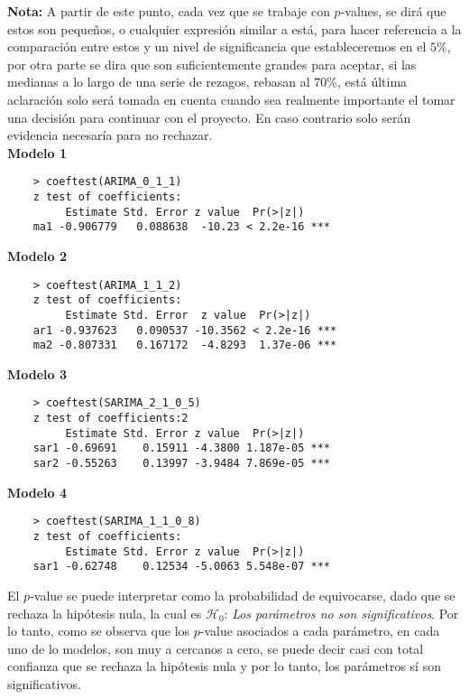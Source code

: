 \documentclass{article}
\theoremstyle{remark}
\begin{document}
\textbf{Nota:} A partir de este punto, cada vez que se trabaje con \(p\)-values, se dirá que estos son pequeños, o cualquier expresión similar a está, para hacer referencia a la comparación entre estos y un nivel de significancia que estableceremos en el \(5\%\), por otra parte se dira que son suficientemente grandes para aceptar, si las medianas a lo largo de una serie de rezagos, rebasan al \(70\%\), está última aclaración solo será tomada en cuenta cuando sea realmente importante el tomar una decisión para continuar con el proyecto. En caso contrario solo serán evidencia necesaría para no rechazar.\\

\textbf{Modelo 1}
\begin{verbatim}
    > coeftest(ARIMA_0_1_1)
    z test of coefficients:
         Estimate Std. Error z value  Pr(>|z|)    
    ma1 -0.906779   0.088638  -10.23 < 2.2e-16 ***
\end{verbatim}

\textbf{Modelo 2}
\begin{verbatim}
    > coeftest(ARIMA_1_1_2)
    z test of coefficients:
         Estimate Std. Error  z value  Pr(>|z|)    
    ar1 -0.937623   0.090537 -10.3562 < 2.2e-16 ***
    ma2 -0.807331   0.167172  -4.8293  1.37e-06 ***
\end{verbatim}
 
\textbf{Modelo 3}
\begin{verbatim}
    > coeftest(SARIMA_2_1_0_5)
    z test of coefficients:2
         Estimate Std. Error z value  Pr(>|z|)    
    sar1 -0.69691    0.15911 -4.3800 1.187e-05 ***
    sar2 -0.55263    0.13997 -3.9484 7.869e-05 ***
\end{verbatim}

\textbf{Modelo 4}
\begin{verbatim}
    > coeftest(SARIMA_1_1_0_8)
    z test of coefficients:
         Estimate Std. Error z value  Pr(>|z|)    
    sar1 -0.62748    0.12534 -5.0063 5.548e-07 ***
\end{verbatim}


El \(p\)-value se puede interpretar como la probabilidad de equivocarse, dado que se rechaza la hipótesis nula, la cual es $\mathscr{H}_0$:\textit{ Los parámetros no son significativos}. Por lo tanto, como se observa que los \(p\)-value asociados a cada parámetro, en cada uno de lo modelos, son muy a cercanos a cero, se puede decir casi con total confianza que se rechaza la hipótesis nula y por lo tanto, los parámetros sí son significativos.  
\end{document}
